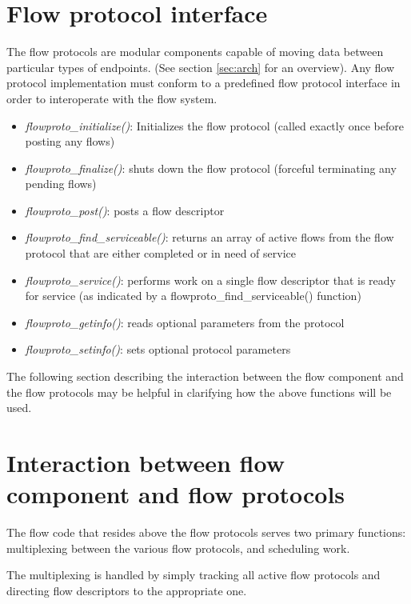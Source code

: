 \documentclass[12pt]{article} %
\begin{document}
\section{Flow protocol interface}

The flow protocols are modular components capable of moving data between
particular types of endpoints.  (See section \ref{sec:arch} for an
overview).  Any flow protocol implementation must conform to a
predefined flow protocol interface in order to interoperate with the
flow system.  

\begin{itemize}
	\item \emph{flowproto\_initialize()}: Initializes the flow
	protocol (called exactly once before posting any flows)
	\item \emph{flowproto\_finalize()}: shuts down the flow
	protocol (forceful terminating any pending flows)
	\item \emph{flowproto\_post()}: posts a flow descriptor
	\item \emph{flowproto\_find\_serviceable()}: returns an array of active
	flows from the flow protocol that are either completed or in need of
	service
	\item \emph{flowproto\_service()}: performs work on a single
	flow descriptor that is ready for service (as indicated by a
	flowproto\_find\_serviceable() function)
	\item \emph{flowproto\_getinfo()}: reads optional parameters
	from the protocol
	\item \emph{flowproto\_setinfo()}: sets optional protocol
	parameters
\end{itemize}

The following section describing the interaction between the flow component
and the flow protocols may be helpful in clarifying how the above functions
will be used.

\section{Interaction between flow component and flow protocols}

The flow code that resides above the flow protocols serves two primary
functions: multiplexing between the various flow protocols, and scheduling
work.

The multiplexing is handled by simply tracking all active flow protocols and
directing flow descriptors to the appropriate one. 
\end{document}
